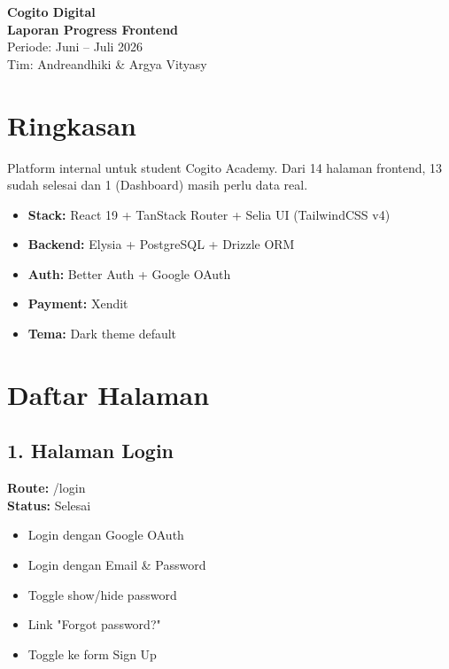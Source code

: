 \documentclass[11pt,a4paper]{article}
\begin{document}
\begin{center}
    {\LARGE \textbf{Cogito Digital}}\\[4pt]
    {\Large \textbf{Laporan Progress Frontend}}\\[8pt]
    {\normalsize Periode: Juni -- Juli 2026}\\
    {\normalsize Tim: Andreandhiki \& Argya Vityasy}
\end{center}

\vspace{1em}

\section*{Ringkasan}

Platform internal untuk student Cogito Academy. Dari 14 halaman frontend, 13 sudah selesai dan 1 (Dashboard) masih perlu data real.

\begin{itemize}
    \item \textbf{Stack:} React 19 + TanStack Router + Selia UI (TailwindCSS v4)
    \item \textbf{Backend:} Elysia + PostgreSQL + Drizzle ORM
    \item \textbf{Auth:} Better Auth + Google OAuth
    \item \textbf{Payment:} Xendit
    \item \textbf{Tema:} Dark theme default
\end{itemize}

\section*{Daftar Halaman}

\subsection*{1. Halaman Login}
\textbf{Route:} /login \\
\textbf{Status:} Selesai

\begin{itemize}
    \item Login dengan Google OAuth
    \item Login dengan Email \& Password
    \item Toggle show/hide password
    \item Link "Forgot password?"
    \item Toggle ke form Sign Up
\end{itemize}
\end{document}
